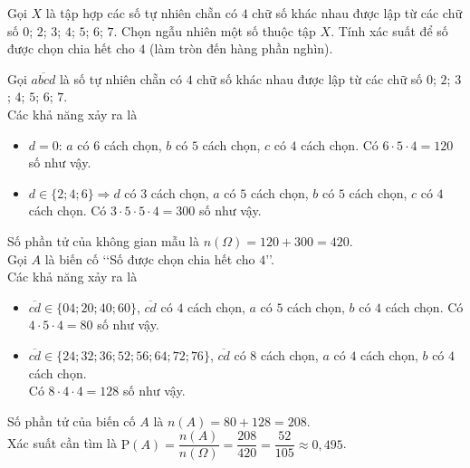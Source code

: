 \begin{ex}%
Gọi $X$ là tập hợp các số tự nhiên chẵn có $4$ chữ số khác nhau được lập từ các chữ	số $0$; $2$; $3$; $4$; $5$; $6$; $7$. Chọn ngẫu nhiên một số thuộc tập $X$. Tính xác suất để số được chọn chia hết cho $4$ (làm tròn đến hàng phần nghìn).
\loigiai
{
Gọi $\overline{abcd}$ là số tự nhiên chẵn có $4$ chữ số khác nhau được lập từ các chữ số $0$; $2$; $3$; $4$; $5$; $6$; $7$.\\ Các khả năng xảy ra là
\begin{itemize}
\item $d=0$: $a$ có $6$ cách chọn, $b$ có $5$ cách chọn, $c$ có $4$ cách chọn. Có $6\cdot 5\cdot 4=120$ số như vậy.
\item $d\in \{2;4;6\}\Rightarrow d$ có $3$ cách chọn, $a$ có $5$ cách chọn, $b$ có $5$ cách chọn, $c$ có $4$ cách chọn. Có $3\cdot 5\cdot 5\cdot 4=300$ số như vậy.
\end{itemize}
Số phần tử của không gian mẫu là $n(\Omega)=120+300=420$.\\
Gọi $A$ là biến cố \lq\lq Số được chọn chia hết cho $4$\rq\rq.\\
Các khả năng xảy ra là
\begin{itemize}
\item $\overline{cd}\in \{04;20;40;60\}$, $\overline{cd}$ có $4$ cách chọn, $a$ có $5$ cách chọn, $b$ có $4$ cách chọn. Có $4\cdot 5\cdot 4=80$ số như vậy.
\item $\overline{cd}\in \{24;32;36;52;56;64;72;76\}$, $\overline{cd}$ có $8$ cách chọn, $a$ có $4$ cách chọn, $b$ có $4$ cách chọn.\\ Có $8\cdot 4\cdot 4=128$ số như vậy.
\end{itemize}
Số phần tử của biến cố $A$ là $n(A)=80+128=208$.\\
Xác suất cần tìm là $\mathrm{P}(A)=\dfrac{n(A)}{n(\Omega)}=\dfrac{208}{420}=\dfrac{52}{105} \approx 0{,}495$.
}
\end{ex}
